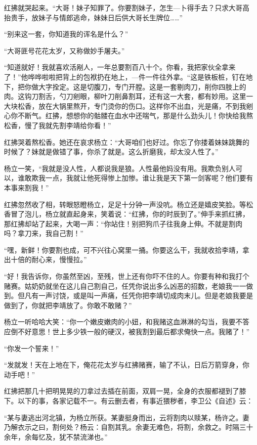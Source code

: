 红拂就哭起来。“大哥！妹子知罪了。你要割妹子，怎生—卜得手去？只求大哥高抬贵手，放妹子与情郎逃命，妹妹日后供大哥长生牌位……”

“别来这一套，你知道我的诨名是什么？”

“大哥匪号花花太岁，又称做妙手屠夫。”

“知道就好！我就喜欢活剐人，一年总要割百八十个。你看，我把家伙全拿来了！”他哗哗啦啦把背上的包袱扔在地上，—件一件往外拿。“这是铁板桩，钉在地下，把你做大字拴定。这是切腹刀，专门开膛。这是一套剔肉刀，削你四肢上的肉。这钩刀割舌，勺刀剜眼，柳叶刀削鼻割耳，还有这一大套，都有妙用。这里一大块松香，放在大锅里熬开，专门烫你的伤口。这样你不出血，光是痛，不到我剜心你不断气。红拂，想想你的骷髅在血水中还喘气，那是什么劲头儿！你快给我熬松香，慢了我就先割李靖给你看！”

红拂哭着熬松香。她还在哀求杨立：“大哥咱们也好过。你忘了你搂着妹妹跳舞的时候了？妹就是做错了事，你杀了就是。这么折磨我，却太没人性了。”

杨立一笑，“我就是没人性，人都说我是狼。人性最他妈没有用。我欺负别人可以，谁敢欺我一点，我就让他死得惨上加惨。谁让我是天下第一剑客呢？他们要有本事来割我！”

红拂忽然收了相，转眼怒瞪杨立，足足十分钟一声没吭。杨立还是嬉皮笑脸。等松香冒了泡儿，杨立就直起身来，笑着说：“红拂，你的时辰到了。”伸手来抓红拂，那红拂却站了起来，大喝一声：“你站住！别把狗爪子往我身上伸。不就是割肉吗？拿刀来，我自己割！”

“嘿，新鲜！你要割也成，可不兴往心窝里一捅。你要这么干，我就收拾李靖，拿出十倍的耐心来，慢慢拉。”

“好！我告诉你，你虽然至凶，至残，世上还有你吓不住的人。你要有种和我打个赌赛。姑奶奶就坐在这儿自己割自己，任凭你说出多么凶恶的招数，老娘我一一做到。但凡有一声讨饶，或是叫一声痛，任凭你把李靖切成肉末儿。但是老娘我要是做到了，你就把李靖放了。你敢不敢赌？”

杨立一听哈哈大笑：“你一个嫩皮嫩肉的小妞，和我赌这血淋淋的勾当，我要不答应倒不好意思！世上多少铁一般的硬汉，被我割到最后都求俺快一点。我赌了！”

“你发一个誓来！”

“发就发！天在上地在下，俺花花太岁与红拂赌赛，输了不认，日后万箭穿身，你动手吧！”

红拂把那几十把明晃晃的刀拿过去插在前面，双肩一晃，全身的衣服都褪到了膝下。以下的事，各家记载不一。有云删去者，有事近猥秽者，李卫公《自述》云：

“某与妻逃出河北镇，为杨立所获。某妻挺身而出，云将割肉以赎某，杨许之。妻乃解衣示之曰，割何处？杨云：自割其乳。余妻无难色，将割，余救之。时隔三十余年，余每忆及，犹不禁流涕也。”

